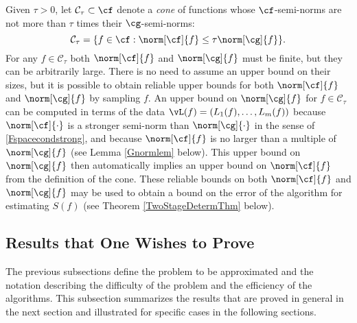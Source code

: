 \documentclass[final]{elsarticle}
\newcommand{\cc}{\mathcal{C}}
\theoremstyle{definition}
\theoremstyle{remark}
\begin{document}
Given $\tau>0$, let $\cc_{\tau} \subset \cf$ denote a \emph{cone} of functions whose $\cf$-semi-norms are not more than $\tau$ times their $\cg$-semi-norms:
\begin{equation} \label{conedef}
\cc_{\tau}=\{f \in \cf : \norm[\cf]{f} \le \tau \norm[\cg]{f} \}.
\end{equation}
For any $f \in \cc_{\tau}$ both $\norm[\cf]{f}$ and $\norm[\cg]{f}$ must be finite, but they can be arbitrarily large.  There is no need to assume an upper bound on their sizes, but it is possible to obtain reliable upper bounds for both $\norm[\cf]{f}$ and $\norm[\cg]{f}$ by sampling $f$.  An upper bound on $\norm[\cg]{f}$ for $f \in \cc_{\tau}$ can be computed in terms of the data $\vL(f)=(L_1(f), \ldots, L_m(f))$ because $\norm[\cf]{\cdot}$ is a stronger semi-norm than $\norm[\cg]{\cdot}$ in the sense of \eqref{Fspacecondstrong}, and because $\norm[\cf]{f}$ is no larger than a multiple of $\norm[\cg]{f}$ (see Lemma \ref{Gnormlem} below). This upper bound on $\norm[\cg]{f}$ then automatically implies an upper bound on $\norm[\cf]{f}$ from the definition of the cone. These reliable bounds on both $\norm[\cf]{f}$ and $\norm[\cg]{f}$ may be used to obtain a bound on the error of the algorithm for estimating $S(f)$  (see Theorem \ref{TwoStageDetermThm} below).

\subsection{Results that One Wishes to Prove}  The previous subsections define the problem to be approximated and the notation describing the difficulty of the problem and the efficiency of the algorithms.  This subsection summarizes the results that are proved in general in the next section and illustrated for specific cases in the following sections.
\end{document}
